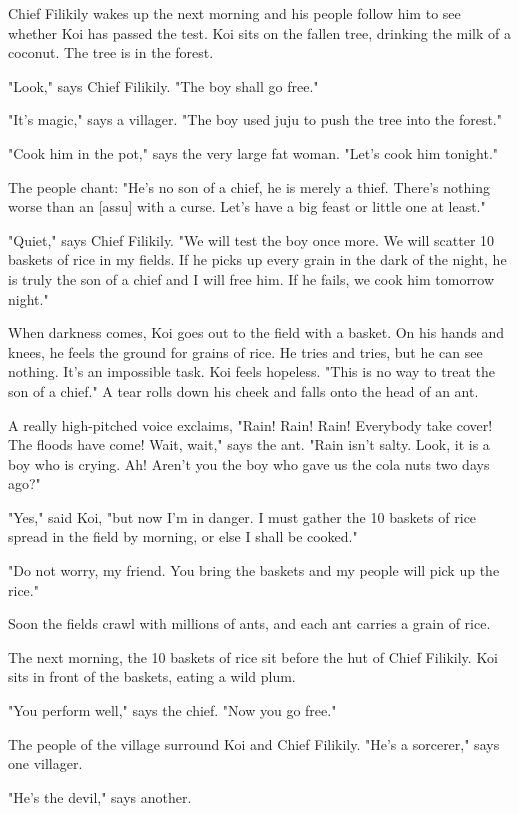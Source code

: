 Chief Filikily wakes up the next morning and his people follow him to see whether Koi has passed the test. Koi sits on the fallen tree, drinking the milk of a coconut. The tree is in the forest.

"Look," says Chief Filikily. "The boy shall go free."

"It's magic," says a villager. "The boy used juju to push the tree into the forest."

"Cook him in the pot," says the very large fat woman. "Let's cook him tonight."

The people chant: "He's no son of a chief, he is merely a thief. There's nothing worse than an [assu] with a curse. Let's have a big feast or little one at least."

"Quiet," says Chief Filikily. "We will test the boy once more. We will scatter 10 baskets of rice in my fields. If he picks up every grain in the dark of the night, he is truly the son of a chief and I will free him. If he fails, we cook him tomorrow night."

When darkness comes, Koi goes out to the field with a basket. On his hands and knees, he feels the ground for grains of rice. He tries and tries, but he can see nothing. It's an impossible task. Koi feels hopeless. "This is no way to treat the son of a chief." A tear rolls down his cheek and falls onto the head of an ant.

A really high-pitched voice exclaims, "Rain! Rain! Rain! Everybody take cover! The floods have come! Wait, wait," says the ant. "Rain isn't salty. Look, it is a boy who is crying. Ah! Aren't you the boy who gave us the cola nuts two days ago?"

"Yes," said Koi, "but now I'm in danger. I must gather the 10 baskets of rice spread in the field by morning, or else I shall be cooked."

"Do not worry, my friend. You bring the baskets and my people will pick up the rice."

Soon the fields crawl with millions of ants, and each ant carries a grain of rice.

The next morning, the 10 baskets of rice sit before the hut of Chief Filikily. Koi sits in front of the baskets, eating a wild plum.

"You perform well," says the chief. "Now you go free."

The people of the village surround Koi and Chief Filikily. "He's a sorcerer," says one villager.

"He's the devil," says another.

